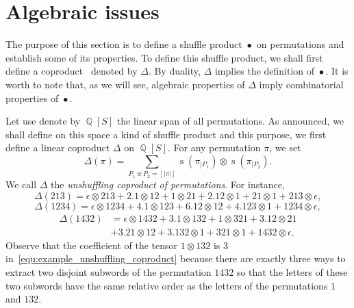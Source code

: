 \documentclass[a4paper,10pt]{llncs}
\DeclareMathOperator{\QQ}{\mathbb{Q}}
\DeclareMathOperator{\STD}{\mathrm{s}}
\DeclareMathOperator{\SHUFFLE}{\bullet}
\begin{document}

\section{Algebraic issues}
\label{section:Algebraic issues}
The purpose of this section is to define a shuffle product $\SHUFFLE$
on permutations and establish some of its properties. To define this
shuffle product, we shall first define a coproduct~\cite{Joni:Rota:1979}
denoted by $\Delta$. By duality, $\Delta$ implies the definition of
$\SHUFFLE$. It is worth to note that, as we will see, algebraic
properties of $\Delta$ imply combinatorial properties of $\SHUFFLE$.
\medskip

Let use denote by $\QQ[S]$ the linear span of all permutations. As
announced, we shall define on this space a kind of shuffle product and
this purpose, we first define a linear coproduct $\Delta$ on $\QQ[S]$.
For any permutation $\pi$, we set
\begin{equation} \label{equ:unshuffling_coproduct}
    \Delta(\pi) =
    \sum_{P_1 \uplus P_2 = [|\pi|]}
    \STD\left(\pi_{|P_1}\right) \otimes \STD\left(\pi_{|P_2}\right).
\end{equation}
We call $\Delta$ the {\em unshuffling coproduct of permutations}. For
instance,
\begin{equation}
    \Delta(213) =
    \epsilon \otimes 213 + 2. 1 \otimes 12 +
    1 \otimes 21 + 2. 12 \otimes 1 + 21 \otimes 1 + 213 \otimes \epsilon,
\end{equation}
\begin{equation}
    \Delta(1234) =
    \epsilon \otimes 1234 + 4. 1 \otimes 123 + 6. 12 \otimes 12 +
    4. 123 \otimes 1 + 1234 \otimes \epsilon,
\end{equation}
\begin{equation}\begin{split} \label{equ:example_unshuffling_coproduct}
    \Delta(1432) & =
    \epsilon \otimes 1432 + 3. 1 \otimes 132 + 1 \otimes 321 +
    3. 12 \otimes 21 \\ & + 3. 21 \otimes 12 + 3. 132 \otimes 1 +
    321 \otimes 1 + 1432 \otimes \epsilon.
\end{split}\end{equation}
Observe that the coefficient of the tensor $1 \otimes 132$ is $3$
in~\eqref{equ:example_unshuffling_coproduct} because there are exactly
three ways to extract two disjoint subwords of the permutation $1432$
so that the letters of these two subwords have the same relative order
as the letters of the permutations $1$ and $132$.
\medskip
\end{document}
